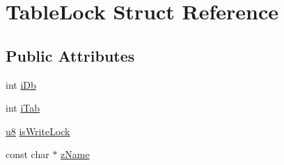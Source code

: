 \hypertarget{struct_table_lock}{\section{Table\-Lock Struct Reference}
\label{struct_table_lock}
}
\subsection*{Public Attributes}
\begin{DoxyCompactItemize}
\item 
int \hyperlink{struct_table_lock_ad5cc726ef29ffcca39ec0b72942513f6}{i\-Db}
\item 
int \hyperlink{struct_table_lock_ab25b5d9ba21ed96ed68ce8064ff84e24}{i\-Tab}
\item 
\hyperlink{sqlite3_8c_a74a0f6424ae628af25f23f0a35f6ead3}{u8} \hyperlink{struct_table_lock_a171121af9886ee08044d4b82b991ceeb}{is\-Write\-Lock}
\item 
const char $\ast$ \hyperlink{struct_table_lock_ad1ce077fbd2600dd6d23ec08706dd227}{z\-Name}
\end{DoxyCompactItemize}


